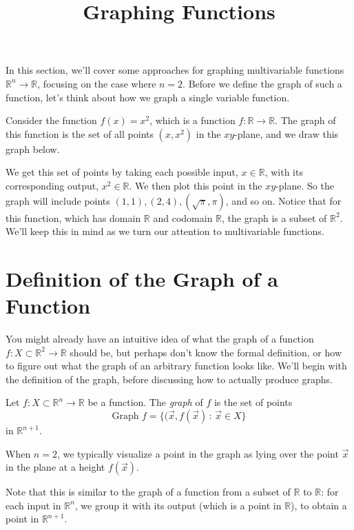 \documentclass{ximera}
\title{Graphing Functions}
\begin{document}
\begin{abstract}
\end{abstract}
\maketitle

In this section, we'll cover some approaches for graphing multivariable functions $\mathbb{R}^n\rightarrow\mathbb{R}$, focusing on the case where $n=2$. Before we define the graph of such a function, let's think about how we graph a single variable function.

Consider the function $f(x) = x^2$, which is a function $f:\mathbb{R}\rightarrow\mathbb{R}$. The graph of this function is the set of all points $(x,x^2)$ in the $xy$-plane, and we draw this graph below.


We get this set of points by taking each possible input, $x\in\mathbb{R}$, with its corresponding output, $x^2\in\mathbb{R}$. We then plot this point in the $xy$-plane. So the graph will include points $(1,1), (2,4), (\sqrt{\pi}, \pi)$, and so on. Notice that for this function, which has domain $\mathbb{R}$ and codomain $\mathbb{R}$, the graph is a subset of $\mathbb{R}^2$. We'll keep this in mind as we turn our attention to multivariable functions.

\section*{Definition of the Graph of a Function}

You might already have an intuitive idea of what the graph of a function $f:X\subset\mathbb{R}^2\rightarrow\mathbb{R}$ should be, but perhaps don't know the formal definition, or how to figure out what the graph of an arbitrary function looks like. We'll begin with the definition of the graph, before discussing how to actually produce graphs.

\begin{definition}
Let $f:X\subset\mathbb{R}^n\rightarrow\mathbb{R}$ be a function. The \emph{graph} of $f$ is the set of points
\[
\textrm{Graph }f = \{(\vec{x},f(\vec{x})\,:\,\vec{x}\in X\}
\]
in $\mathbb{R}^{n+1}$.

When $n=2$, we typically visualize a point in the graph as lying over the point $\vec{x}$ in the plane at a height $f(\vec{x})$.
\end{definition}

Note that this is similar to the graph of a function from a subset of $\mathbb{R}$ to $\mathbb{R}$: for each input in $\mathbb{R}^n$, we group it with its output (which is a point in $\mathbb{R}$), to obtain a point in $\mathbb{R}^{n+1}$.
\end{document}
